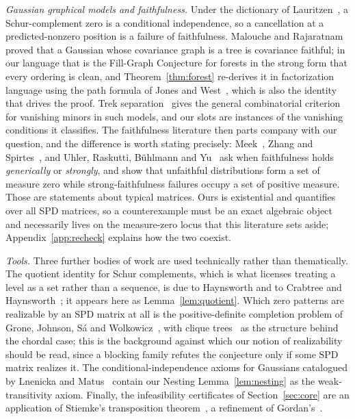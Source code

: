 \documentclass[11pt]{article}
\theoremstyle{plain}
\theoremstyle{definition}
\begin{document}
\begin{humanblock}
\emph{Gaussian graphical models and faithfulness.} Under the dictionary of Lauritzen~\cite{Lauritzen},
a Schur-complement zero is a conditional independence, so a cancellation at a predicted-nonzero
position is a failure of faithfulness. Malouche and Rajaratnam~\cite{Malouche} proved that a Gaussian
whose covariance graph is a tree is covariance faithful; in our language that is the Fill-Graph
Conjecture for forests in the strong form that every ordering is clean, and
Theorem~\ref{thm:forest} re-derives it in factorization language using the path formula of Jones and
West~\cite{Jones}, which is also the identity that drives the proof. Trek
separation~\cite{Sullivant} gives the general combinatorial criterion for vanishing minors in such
models, and our slots are instances of the vanishing conditions it classifies. The faithfulness
literature then parts company with our question, and the difference is worth stating precisely:
Meek~\cite{Meek}, Zhang and Spirtes~\cite{Zhang}, and Uhler, Raskutti, B\"uhlmann and Yu~\cite{Uhler}
ask when faithfulness holds \emph{generically} or \emph{strongly}, and show that unfaithful
distributions form a set of measure zero while strong-faithfulness failures occupy a set of positive
measure. Those are statements about typical matrices. Ours is existential and quantifies over all SPD
matrices, so a counterexample must be an exact algebraic object and necessarily lives on the
measure-zero locus that this literature sets aside; Appendix~\ref{app:recheck} explains how the two
coexist.

\emph{Tools.} Three further bodies of work are used technically rather than thematically. The quotient
identity for Schur complements, which is what licenses treating a level as a set rather than a
sequence, is due to Haynsworth and to Crabtree and Haynsworth~\cite{Haynsworth,Crabtree}; it appears
here as Lemma~\ref{lem:quotient}. Which zero patterns are realizable by an SPD matrix at all is the
positive-definite completion problem of Grone, Johnson, S\'a and Wolkowicz~\cite{Grone}, with clique
trees~\cite{Blair} as the structure behind the chordal case; this is the background against which our
notion of realizability should be read, since a blocking family refutes the conjecture only if some
SPD matrix realizes it. The conditional-independence axioms for Gaussians catalogued by Lnenicka and
Matus~\cite{Lnenicka} contain our Nesting Lemma~\ref{lem:nesting} as the weak-transitivity axiom.
Finally, the infeasibility certificates of Section~\ref{sec:core} are an application of Stiemke's
transposition theorem~\cite{Stiemke}, a refinement of Gordan's~\cite{Gordan}.


\end{humanblock}
\end{document}
